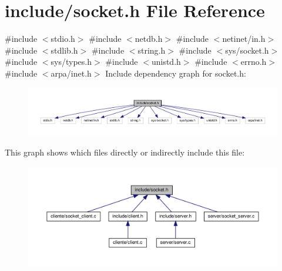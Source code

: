 \section{include/socket.h File Reference}
\label{socket_8h}
{\ttfamily \#include $<$stdio.\+h$>$}\newline
{\ttfamily \#include $<$netdb.\+h$>$}\newline
{\ttfamily \#include $<$netinet/in.\+h$>$}\newline
{\ttfamily \#include $<$stdlib.\+h$>$}\newline
{\ttfamily \#include $<$string.\+h$>$}\newline
{\ttfamily \#include $<$sys/socket.\+h$>$}\newline
{\ttfamily \#include $<$sys/types.\+h$>$}\newline
{\ttfamily \#include $<$unistd.\+h$>$}\newline
{\ttfamily \#include $<$errno.\+h$>$}\newline
{\ttfamily \#include $<$arpa/inet.\+h$>$}\newline
Include dependency graph for socket.\+h\+:\nopagebreak
\begin{figure}[H]
\begin{center}
\leavevmode
\includegraphics[width=350pt]{socket_8h__incl}
\end{center}
\end{figure}
This graph shows which files directly or indirectly include this file\+:
\nopagebreak
\begin{figure}[H]
\begin{center}
\leavevmode
\includegraphics[width=350pt]{socket_8h__dep__incl}
\end{center}
\end{figure}
